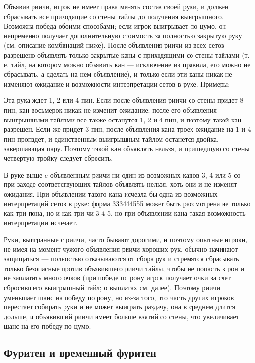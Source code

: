 Объявив риичи, игрок не имеет права менять состав своей руки, и должен сбрасывать все приходящие со стены тайлы до получения выигрышного. Возможна победа обоими способами; если игрок выигрывает по цумо, он непременно получает дополнительную стоимость за полностью закрытую руку (см. описание комбинаций ниже). После объявления риичи из всех сетов разрешено объявлять только закрытые каны с приходящими со стены тайлами (т. е. тайл, на котором можно объявить кан --- исключение из правила, его можно не сбрасывать, а сделать на нем объявление), и только если эти каны никак не изменяют ожидание и возможности интерпретации сетов в руке. Примеры:


Эта рука ждет 1, 2 или 4 пин. Если после объявления риичи со стены придет 8 пин, кан восьмерок никак не изменит ожидание: после его объявления выигрышными тайлами все также останутся 1, 2 и 4 пин, и поэтому такой кан разрешен. Если же придет 3 пин, после объявления кана троек ожидание на 1 и 4 пин пропадет, и единственным выигрышным тайлом останется двойка, завершающая пару. Поэтому такой кан объявлять нельзя, и пришедшую со стены четвертую тройку следует сбросить. 


В руке выше c объявленным риичи ни один из возможных канов 3, 4 или 5 со при заходе соответствующих тайлов объявлять нельзя, хоть они и не изменят ожидания. При объявлении такого кана исчезла бы одна из возможных интерпретаций сетов в руке: форма 333444555 может быть рассмотрена не только как три пона, но и как три чи 3-4-5, но при объявлении кана такая возможность интерпретации исчезает. 

Руки, выигранные с риичи, часто бывают дорогими, и поэтому опытные игроки, не имея на момент чужого объявления риичи хороших рук, обычно начинают защищаться --- полностью отказываются от сбора рук и стремятся сбрасывать только безопасные против объявившего риичи тайлы, чтобы не попасть в рон и не заплатить много очков (при победе по рону игрок получает очки за счет сбросившего выигрышный тайл; о выплатах см. далее). Поэтому риичи уменьшает шанс на победу по рону, но из-за того, что часть других игроков перестает собирать руки и не может выиграть раздачу, она в среднем длится дольше, и объявивший риичи имеет больше взятий со стены, что увеличивает шанс на его победу по цумо.

\subsection{Фуритен и временный фуритен}

